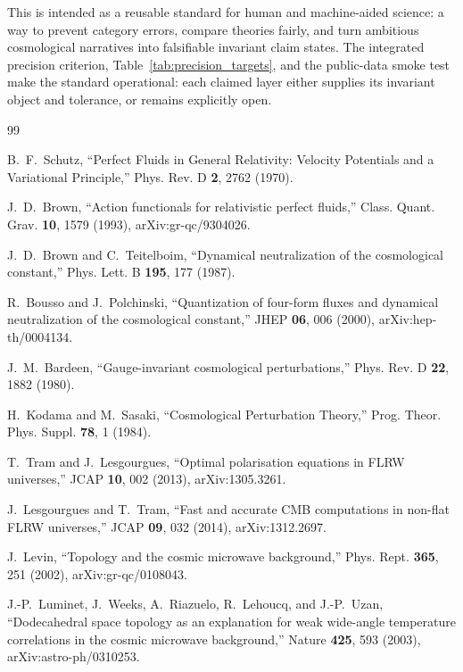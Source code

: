 \documentclass[
  aps,
  prd,
  reprint,
  superscriptaddress,
  floatfix,
  nofootinbib,
  longbibliography
]{revtex4-2}
\theoremstyle{plain}
\theoremstyle{definition}
\theoremstyle{remark}
\begin{document}
This is intended as a reusable standard for human and machine-aided science: a way to prevent category errors, compare theories fairly, and turn ambitious cosmological narratives into falsifiable invariant claim states.  The integrated precision criterion, Table~\ref{tab:precision_targets}, and the public-data smoke test make the standard operational: each claimed layer either supplies its invariant object and tolerance, or remains explicitly open.

\begin{sloppypar}
\begin{thebibliography}{99}
\raggedright

B.~F.~Schutz,
``Perfect Fluids in General Relativity: Velocity Potentials and a Variational Principle,''
Phys. Rev. D \textbf{2}, 2762 (1970).

J.~D.~Brown,
``Action functionals for relativistic perfect fluids,''
Class. Quant. Grav. \textbf{10}, 1579 (1993),
arXiv:gr-qc/9304026.

J.~D.~Brown and C.~Teitelboim,
``Dynamical neutralization of the cosmological constant,''
Phys. Lett. B \textbf{195}, 177 (1987).

R.~Bousso and J.~Polchinski,
``Quantization of four-form fluxes and dynamical neutralization of the cosmological constant,''
JHEP \textbf{06}, 006 (2000),
arXiv:hep-th/0004134.

J.~M.~Bardeen,
``Gauge-invariant cosmological perturbations,''
Phys. Rev. D \textbf{22}, 1882 (1980).

H.~Kodama and M.~Sasaki,
``Cosmological Perturbation Theory,''
Prog. Theor. Phys. Suppl. \textbf{78}, 1 (1984).

T.~Tram and J.~Lesgourgues,
``Optimal polarisation equations in FLRW universes,''
JCAP \textbf{10}, 002 (2013),
arXiv:1305.3261.

J.~Lesgourgues and T.~Tram,
``Fast and accurate CMB computations in non-flat FLRW universes,''
JCAP \textbf{09}, 032 (2014),
arXiv:1312.2697.

J.~Levin,
``Topology and the cosmic microwave background,''
Phys. Rept. \textbf{365}, 251 (2002),
arXiv:gr-qc/0108043.

J.-P.~Luminet, J.~Weeks, A.~Riazuelo, R.~Lehoucq, and J.-P.~Uzan,
``Dodecahedral space topology as an explanation for weak wide-angle temperature correlations in the cosmic microwave background,''
Nature \textbf{425}, 593 (2003),
arXiv:astro-ph/0310253.


\end{thebibliography}
\end{sloppypar}
\end{document}
